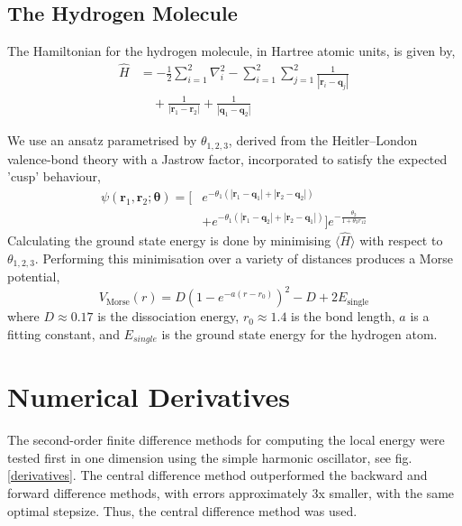 \documentclass[journal,12pt]{Imperial_lab_report}
\begin{document}
    \subsection{The Hydrogen Molecule}
        The Hamiltonian for the hydrogen molecule, in Hartree atomic units, is given by,
        \begin{equation*}
            \begin{split}
            \hat{H} &= -\frac{1}{2} \sum_{i=1}^{2} \nabla_i^2 
                      - \sum_{i=1}^{2} \sum_{j=1}^{2} \frac{1}{|\mathbf{r}_i - \mathbf{q}_j|} \\[1ex]
                    &\quad + \frac{1}{|\mathbf{r}_1 - \mathbf{r}_2|} 
                      + \frac{1}{|\mathbf{q}_1 - \mathbf{q}_2|}
            \end{split}
            \end{equation*}

        \noindent We use an ansatz parametrised by $\theta_{1,2,3}$, derived from the Heitler–London valence-bond theory with a Jastrow factor, incorporated to satisfy the expected 'cusp' behaviour,
        \begin{equation}
            \begin{split}
                \psi(\mathbf{r}_1, \mathbf{r}_2; \boldsymbol{\theta}) = \bigg[ & e^{-\theta_1 (|\mathbf{r}_1 - \mathbf{q}_1| + |\mathbf{r}_2 - \mathbf{q}_2|)} \\
                & + e^{-\theta_1 (|\mathbf{r}_1 - \mathbf{q}_2| + |\mathbf{r}_2 - \mathbf{q}_1|)} \bigg] e^{-\frac{\theta_2}{1+\theta_3 r_{12}}}
            \end{split}
        \end{equation}
        \noindent Calculating the ground state energy is done by minimising $\langle \hat{H} \rangle$ with respect to $\theta_{1,2,3}$. Performing this minimisation over a variety of distances produces a Morse potential, 
        \begin{equation} \label{Morse Pot}
            V_{\text{Morse}}(r) = D \left( 1 - e^{-a(r-r_0)} \right)^2 - D + 2E_{\text{single}}
        \end{equation}
        \noindent where $D\approx0.17$ is the dissociation energy, $r_0\approx1.4$ is the bond length, $a$ is a fitting constant, and $E_{single}$ is the ground state energy for the hydrogen atom.

\section{Numerical Derivatives} \label{Numerical derivatives}
    The second-order finite difference methods for computing the local energy were tested first in one dimension using the simple harmonic oscillator, see fig.\ref{derivatives}. The central difference method outperformed the backward and forward difference methods, with errors approximately 3x smaller, with the same optimal stepsize. Thus, the central difference method was used.
\end{document}
